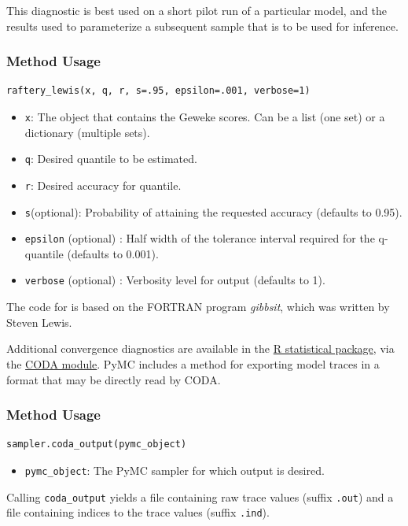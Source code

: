 This diagnostic is best used on a short pilot run of a particular model, and the results used to parameterize a subsequent sample that is to be used for inference.


\subsubsection*{Method Usage}
\begin{verbatim}
raftery_lewis(x, q, r, s=.95, epsilon=.001, verbose=1)
\end{verbatim}
\begin{itemize}
	
	\item \verb=x=: The object that contains the Geweke scores. Can be a list (one set) or a dictionary (multiple sets).
	
    \item \verb=q=: Desired quantile to be estimated.

    \item \verb=r=: Desired accuracy for quantile.

    \item \verb=s=(optional): Probability of attaining the requested accuracy (defaults to 0.95).

    \item \verb=epsilon= (optional) : Half width of the tolerance interval required for the q-quantile (defaults to 0.001).

    \item \verb=verbose= (optional) : Verbosity level for output (defaults to 1).
\end{itemize}

The code for  is based on the FORTRAN program \emph{gibbsit}, which was written by Steven Lewis.

Additional convergence diagnostics are available in the \href{http://lib.stat.cmu.edu/R/CRAN/}{R statistical package}, via the \href{http://www-fis.iarc.fr/coda/}{CODA module}. PyMC includes a method  for exporting model traces in a format that may be directly read by CODA.

\subsubsection*{Method Usage}
\begin{verbatim}
sampler.coda_output(pymc_object)
\end{verbatim}
\begin{itemize}

\item \verb=pymc_object=: The PyMC sampler for which output is desired.

\end{itemize}
Calling \verb=coda_output= yields a file containing raw trace values (suffix \verb=.out=) and a file containing indices to the trace values (suffix \verb=.ind=).

